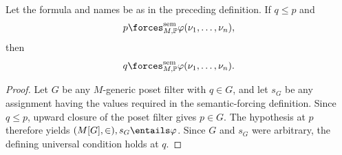 \begin{lemma}
Let the formula and names be as in the preceding definition.  If \(q\leq p\)
and
\[
  p\forces^{\mathrm{sem}}_{M,\mathbb P}
    \varphi(\nu_1,\ldots,\nu_n),
\]
then
\[
  q\forces^{\mathrm{sem}}_{M,\mathbb P}
    \varphi(\nu_1,\ldots,\nu_n).
\]
\end{lemma}

\begin{proof}
Let \(G\) be any \(M\)-generic poset filter with \(q\in G\), and let \(s_G\)
be any assignment having the values required in the semantic-forcing
definition.  Since \(q\leq p\), upward closure of the poset filter gives
\(p\in G\).  The hypothesis at \(p\) therefore yields
\((M[G],\in),s_G\entails\varphi\).  Since \(G\) and \(s_G\) were arbitrary,
the defining universal condition holds at \(q\).
\end{proof}

